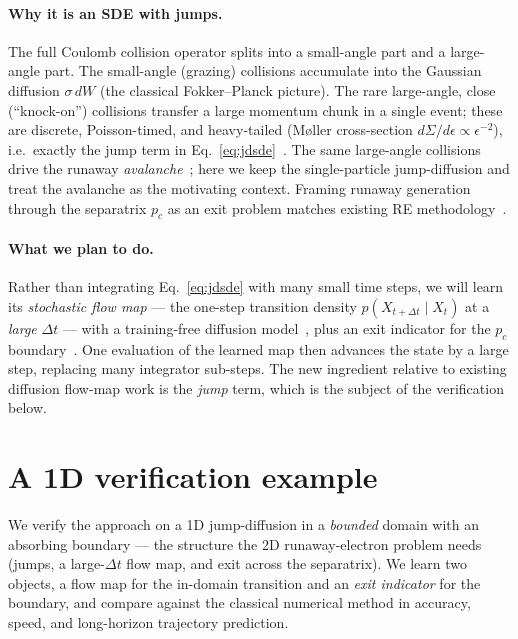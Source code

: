\documentclass[11pt]{article}
\begin{document}
\paragraph{Why it is an SDE with jumps.} The full Coulomb collision operator
splits into a small-angle part and a large-angle part. The small-angle
(grazing) collisions accumulate into the Gaussian diffusion $\sigma\,dW$ (the
classical Fokker--Planck picture). The rare large-angle, close (``knock-on'')
collisions transfer a large momentum chunk in a single event; these are discrete,
Poisson-timed, and heavy-tailed (M{\o}ller cross-section
$d\Sigma/d\epsilon\propto\epsilon^{-2}$), i.e.\ exactly the jump term in
Eq.~\eqref{eq:jdsde}~\cite{embreus2018}. The same large-angle collisions drive
the runaway \emph{avalanche}~\cite{rosenbluth1997}; here we keep the
single-particle jump-diffusion and treat the avalanche as the motivating context.
Framing runaway generation through the separatrix $p_c$ as an exit problem
matches existing RE methodology~\cite{delcastillo_exit}.

\paragraph{What we plan to do.} Rather than integrating Eq.~\eqref{eq:jdsde} with
many small time steps, we will learn its \emph{stochastic flow map} --- the
one-step transition density $p(X_{t+\Delta t}\mid X_t)$ at a \emph{large}
$\Delta t$ --- with a training-free diffusion model~\cite{liu2024,yang2025}, plus
an exit indicator for the $p_c$ boundary~\cite{yang2025}. One evaluation of the
learned map then advances the state by a large step, replacing many integrator
sub-steps. The new ingredient relative to existing diffusion flow-map work is the
\emph{jump} term, which is the subject of the verification below.

\section{A 1D verification example}

We verify the approach on a 1D jump-diffusion in a \emph{bounded} domain with an
absorbing boundary --- the structure the 2D runaway-electron problem needs (jumps,
a large-$\Delta t$ flow map, and exit across the separatrix). We learn two
objects, a flow map for the in-domain transition and an \emph{exit indicator} for
the boundary, and compare against the classical numerical method in accuracy,
speed, and long-horizon trajectory prediction.
\end{document}
